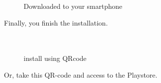 \documentclass[conference]{IEEEtran}
\begin{document}
\begin{figure}[htbp]
\begin{center}
    \caption{Downloaded to your smartphone} 
\end{center}
\end{figure}

Finally, you finish the installation. \\\\\\

\begin{figure}[htbp]
\begin{center}
    \caption{install using QRcode} 
\end{center}
\end{figure}

Or, take this QR-code and access to the Playstore.\\\\\\\\\\\\\\\\
\end{document}
